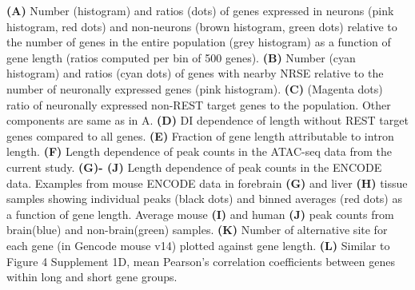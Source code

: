 \textbf{(A)} Number (histogram) and ratios (dots) of genes expressed in neurons (pink histogram, red dots) and non-neurons (brown histogram, green dots) relative to the number of genes in the entire population (grey histogram) as a function of gene length (ratios computed per bin of 500 genes). 
\textbf{(B)} Number (cyan histogram) and ratios (cyan dots) of genes with nearby NRSE relative to the number of neuronally expressed genes (pink histogram). 
\textbf{(C)} (Magenta dots) ratio of neuronally expressed non-REST target genes to the population. Other components are same as in A.
\textbf{(D)} DI dependence of length without REST target genes compared to all genes.
\textbf{(E)} Fraction of gene length attributable to intron length.
\textbf{(F)} Length dependence of peak counts in the ATAC-seq data from the current study.
\textbf{(G)- (J)} Length dependence of peak counts in the ENCODE data. Examples from mouse ENCODE data in forebrain \textbf{(G)} and liver \textbf{(H)} tissue samples showing individual peaks (black dots) and binned averages (red dots) as a function of gene length. Average mouse \textbf{(I)} and human \textbf{(J)} peak counts from brain(blue) and non-brain(green) samples.
\textbf{(K)} Number of alternative site for each gene (in Gencode mouse v14) plotted against gene length.
\textbf{(L)} Similar to Figure 4 Supplement 1D, mean Pearson's correlation coefficients between genes within long and short gene groups.




